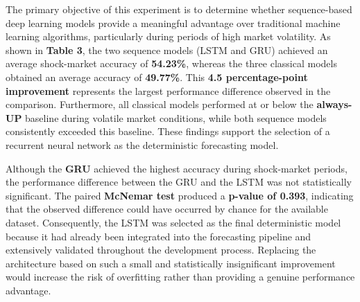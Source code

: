 \begin{table}[H]
\centering
\scriptsize
\setlength{\tabcolsep}{4pt}
\caption{Five candidate models on identical walk-forward folds. The selected model is highlighted.}
\label{tab:candidate-models}
\end{table}

The primary objective of this experiment is to determine whether
sequence-based deep learning models provide a meaningful advantage over
traditional machine learning algorithms, particularly during periods of
high market volatility. As shown in \textbf{Table 3}, the two sequence
models (LSTM and GRU) achieved an average shock-market accuracy of
\textbf{54.23\%}, whereas the three classical models obtained an average
accuracy of \textbf{49.77\%}. This \textbf{4.5 percentage-point
improvement} represents the largest performance difference observed in
the comparison. Furthermore, all classical models performed at or below
the \textbf{always-UP} baseline during volatile market conditions, while
both sequence models consistently exceeded this baseline. These findings
support the selection of a recurrent neural network as the deterministic
forecasting model.

Although the \textbf{GRU} achieved the highest accuracy during
shock-market periods, the performance difference between the GRU and the
LSTM was not statistically significant. The paired \textbf{McNemar test}
produced a \textbf{p-value of 0.393}, indicating that the observed
difference could have occurred by chance for the available dataset.
Consequently, the LSTM was selected as the final deterministic model
because it had already been integrated into the forecasting pipeline and
extensively validated throughout the development process. Replacing the
architecture based on such a small and statistically insignificant
improvement would increase the risk of overfitting rather than providing
a genuine performance advantage.

